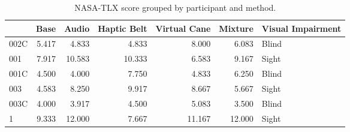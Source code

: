 
\begin{table}[!htb]
\centering
\caption{NASA-TLX score grouped by participant and method.}
\label{tab:nasa_average}
\begin{tabular}{lrrrrrl}
\toprule
{} &  Base &  Audio &  Haptic Belt &  Virtual Cane &  Mixture & Visual Impairment \\
\midrule
002C & 5.417 &  4.833 &        4.833 &         8.000 &    6.083 &             Blind \\
001  & 7.917 & 10.583 &       10.333 &         6.583 &    9.167 &             Sight \\
001C & 4.500 &  4.000 &        7.750 &         4.833 &    6.250 &             Blind \\
003  & 4.583 &  8.250 &        9.917 &         8.667 &    5.667 &             Sight \\
003C & 4.000 &  3.917 &        4.500 &         5.083 &    3.500 &             Blind \\
1    & 9.333 & 12.000 &        7.667 &        11.167 &   12.000 &             Sight \\
\bottomrule
\end{tabular}
\end{table}

